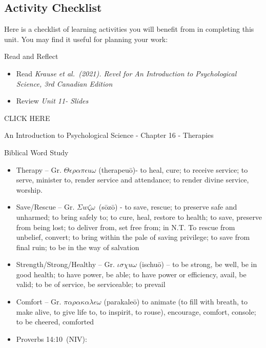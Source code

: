 \documentclass[
]{book}
\providecommand{\tightlist}{%
  \setlength{\itemsep}{0pt}\setlength{\parskip}{0pt}}
\begin{document}
\hypertarget{activity-checklist-9}{%
\subsection*{Activity Checklist}\label{activity-checklist-9}}

\begin{reflect}
Here is a checklist of learning activities you will benefit from in
completing this unit. You may find it useful for planning your work:

{Read and Reflect}

\begin{itemize}
\tightlist
\item
  Read \emph{Krause et al.~(2021). Revel for An Introduction to Psychological Science, 3rd Canadian Edition}\\
\item
  Review \emph{Unit 11- Slides}
\end{itemize}

CLICK HERE

An Introduction to Psychological Science - Chapter 16 - Therapies

Biblical Word Study

\begin{itemize}
\tightlist
\item
  Therapy -- Gr. \(\Theta \epsilon \rho \alpha \pi \epsilon u \omega\) (therapeuō)- to heal, cure; to receive service; to serve, minister to, render service and attendance; to render divine service, worship.\\
\item
  Save/Rescue -- Gr. \(\Sigma w \zeta \omega\)~(sōzō) - to save, rescue; to preserve safe and unharmed; to bring safely to; to cure, heal, restore to health; to save, preserve from being lost; to deliver from, set free from; in N.T. To rescue from unbelief, convert; to bring within the pale of saving privilege; to save from final ruin; to be in the way of salvation\\
\item
  Strength/Strong/Healthy -- Gr. \(\iota \sigma \chi u \omega\) (ischuō) -- to be strong, be well, be in good health; to have power, be able; to have power or efficiency, avail, be valid; to be of service, be serviceable; to prevail\\
\item
  Comfort -- Gr. \(\pi \alpha \rho \alpha \kappa \alpha \lambda e \omega\) (parakaleō) to animate (to fill with breath, to make alive, to give life to, to inspirit, to rouse), encourage, comfort, console; to be cheered, comforted\\
\item
  Proverbs 14:10~(NIV):


\end{itemize}
\end{reflect}
\end{document}
